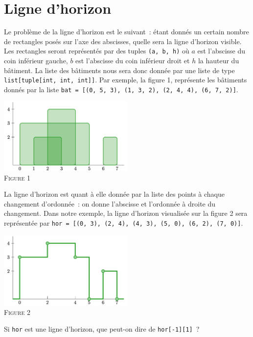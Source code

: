 \documentclass{magnolia}
\begin{document}


\section{Ligne d'horizon}

Le problème de la ligne d'horizon est le suivant~: étant donnés un certain nombre de rectangles posés sur
l'axe des abscisses, quelle sera la ligne d'horizon visible. Les rectangles seront représentés par des
tuples \verb!(a, b, h)! où $a$ est l'abscisse du coin inférieur gauche, $b$ est l'abscisse du coin
inférieur droit et $h$ la hauteur du bâtiment. La liste des bâtiments nous sera donc donnée par une
liste de type \verb!list[tuple[int, int, int]]!. Par exemple, la figure 1, représente les bâtiments donnés
par la liste \verb!bat = [(0, 5, 3), (1, 3, 2), (2, 4, 4), (6, 7, 2)]!.
\begin{center}
\includegraphics[width=0.5\textwidth]{../../commun/images/python-tp-horizon-1}\\
\textsc{Figure 1}
\end{center}
La ligne d'horizon est quant à elle donnée par la liste des points à chaque changement d'ordonnée~: on donne
l'abscisse et l'ordonnée à droite du changement. Dans notre exemple, la ligne d'horizon visualisée sur
la figure 2 sera représentée par \verb!hor = [(0, 3), (2, 4), (4, 3), (5, 0), (6, 2), (7, 0)]!.
\begin{center}
\includegraphics[width=0.5\textwidth]{../../commun/images/python-tp-horizon-2}\\
\textsc{Figure 2}
\end{center}
\begin{questions}
\question Si \verb!hor! est une ligne d'horizon, que peut-on dire de \verb!hor[-1][1]!~?
\end{questions}
\end{document}
